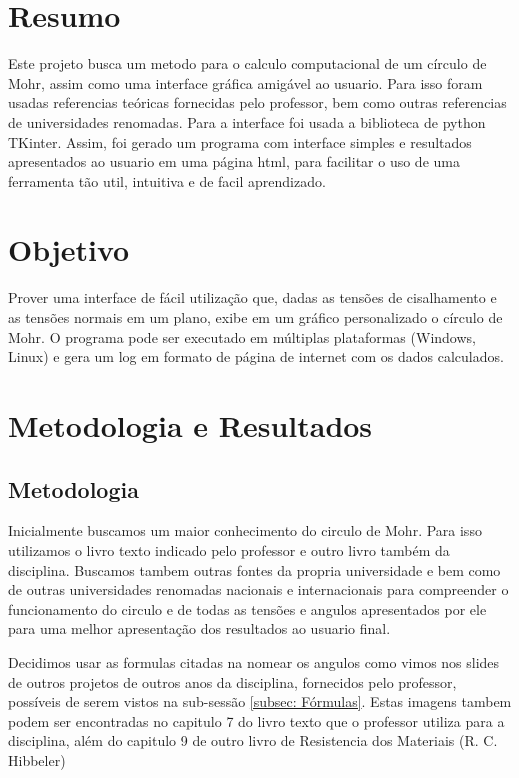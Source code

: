 \documentclass[a4paper]{article}
\begin{document}
\section{Resumo}
Este projeto busca um metodo para o calculo computacional de um círculo de Mohr, assim como uma interface gráfica amigável ao usuario. Para isso foram usadas referencias teóricas fornecidas pelo professor, bem como outras referencias de universidades renomadas. Para a interface foi usada a biblioteca de python TKinter. Assim, foi gerado um programa com interface simples e resultados apresentados ao usuario em uma página html, para facilitar o uso de uma ferramenta tão util, intuitiva e de facil aprendizado.

\section{Objetivo}
Prover uma interface de fácil utilização que, dadas as tensões de cisalhamento e as tensões normais em um plano, exibe em um gráfico personalizado o círculo de Mohr. O programa pode ser executado em múltiplas plataformas (Windows, Linux) e gera um log em formato de página de internet com os dados calculados. 

\section{Metodologia e Resultados}

\subsection{Metodologia}
Inicialmente buscamos um maior conhecimento do circulo de Mohr. Para isso utilizamos o livro texto indicado pelo professor e outro livro também da disciplina. Buscamos tambem outras fontes da propria universidade e bem como de outras universidades renomadas nacionais e internacionais para compreender o funcionamento do circulo e de todas as tensões e angulos apresentados por ele para uma melhor apresentação dos resultados ao usuario final.

Decidimos usar as formulas citadas na  nomear os angulos como vimos nos slides de outros projetos de outros anos da disciplina, fornecidos pelo professor, possíveis de serem vistos na sub-sessão \ref{subsec: Fórmulas}.
Estas imagens tambem podem ser encontradas no capitulo 7 do livro texto que o professor utiliza para a disciplina, além do capitulo 9 de outro livro de Resistencia dos Materiais (R. C. Hibbeler)
\end{document}
